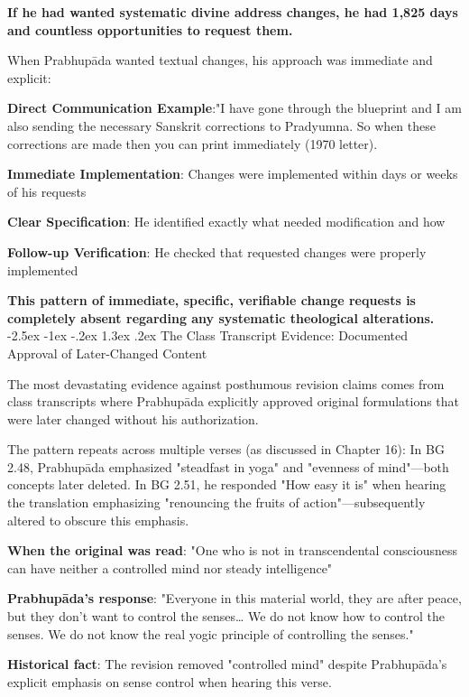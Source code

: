 \documentclass[12pt,twoside]{book}
\makeatletter
\renewcommand\section{\@startsection{section}{1}{\z@}%
{-2.5ex \@plus -1ex \@minus -.2ex}%
{1.3ex \@plus.2ex}%
{\normalfont\Large\bfseries}}
\makeatother
\begin{document}
\textbf{\textbf{If he had wanted systematic divine address changes, he had 1,825 days and countless opportunities to request them.}}

When Prabhupāda wanted textual changes, his approach was immediate and explicit:

\textbf{\textbf{Direct Communication Example}}:"I have gone through the blueprint and I am also sending the necessary Sanskrit corrections to Pradyumna. So when these corrections are made then you can print immediately (1970 letter).

\textbf{\textbf{Immediate Implementation}}: Changes were implemented within days or weeks of his requests

\textbf{\textbf{Clear Specification}}: He identified exactly what needed modification and how

\textbf{\textbf{Follow-up Verification}}: He checked that requested changes were properly implemented

\textbf{\textbf{This pattern of immediate, specific, verifiable change requests is completely absent regarding any systematic theological alterations.}}
\section{The Class Transcript Evidence: Documented Approval of Later-Changed Content}
\label{sec:orge8c8fc3}

The most devastating evidence against posthumous revision claims comes from class transcripts where Prabhupāda explicitly approved original formulations that were later changed without his authorization.

The pattern repeats across multiple verses (as discussed in Chapter 16): In BG 2.48, Prabhupāda emphasized "steadfast in yoga" and "evenness of mind"—both concepts later deleted. In BG 2.51, he responded "How easy it is" when hearing the translation emphasizing "renouncing the fruits of action"—subsequently altered to obscure this emphasis.

\textbf{\textbf{When the original was read}}: "One who is not in transcendental consciousness can have neither a controlled mind nor steady intelligence"

\textbf{\textbf{Prabhupāda's response}}: "Everyone in this material world, they are after peace, but they don't want to control the senses\ldots{} We do not know how to control the senses. We do not know the real yogic principle of controlling the senses."

\textbf{\textbf{Historical fact}}: The revision removed "controlled mind" despite Prabhupāda's explicit emphasis on sense control when hearing this verse.
\end{document}
